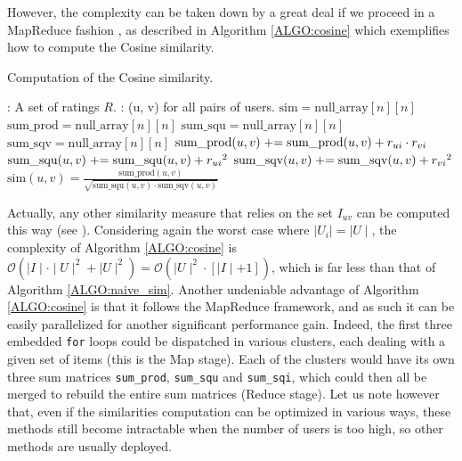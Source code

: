 However, the complexity can be taken down by a great deal if we proceed in a
MapReduce fashion \cite{DeaGhe04}, as described in Algorithm \ref{ALGO:cosine}
which exemplifies how to compute the Cosine similarity.
\begin{algorithm}[!ht]
 \caption{Computation of the Cosine similarity.}
       \label{ALGO:cosine}
       \begin{algorithmic}

         : A set of ratings $R$.
         : (u, v) for all pairs of users.
         \STATE $\text{sim} = \text{null\_array}[n][n]$
         \STATE $\text{sum\_prod} = \text{null\_array}[n][n]$
         \STATE $\text{sum\_squ} = \text{null\_array}[n][n]$
         \STATE $\text{sum\_sqv} = \text{null\_array}[n][n]$
              \STATE $\text{sum\_prod}(u, v) \mathrel{+}= \text{sum\_prod}(u, v) +
              r_{ui} \cdot r_{vi}$
              \STATE $\text{sum\_squ}(u, v) \mathrel{+}= \text{sum\_squ}(u, v) +
              {r_{ui}}^2$
              \STATE $\text{sum\_sqv}(u, v) \mathrel{+}= \text{sum\_sqv}(u, v) +
              {r_{vi}}^2$
             \ENDFOR
           \ENDFOR
         \ENDFOR
           \STATE $\text{sim}(u, v) = \frac{\text{sum\_prod}(u,
           v)}{\sqrt{\text{sum\_squ}(u, v) \cdot \text{sum\_sqv}(u, v)}}$
           \ENDFOR
         \ENDFOR
\end{algorithmic}
\end{algorithm}
Actually, any other similarity measure that relies on the set $I_{uv}$ can be
computed this way (see \cite{SchBodVolRECSYS12}). Considering again the worst
case where $\mid U_i \mid = \mid U \mid$, the complexity of Algorithm
\ref{ALGO:cosine} is  $\mathcal{O}(\mid I \mid \cdot \mid U \mid^2 + \mid
U \mid^2) = \mathcal{O}( \mid U \mid^2 \cdot [ \mid I \mid + 1])$, which is far
less than that of Algorithm \ref{ALGO:naive_sim}. Another undeniable advantage
of Algorithm  \ref{ALGO:cosine} is that it follows the MapReduce framework, and
as such it can be easily parallelized for another significant performance gain.
Indeed, the first three embedded \texttt{for} loops could be dispatched in various
clusters, each dealing with a given set of items (this is the Map stage). Each
of the clusters would have its own three sum matrices \texttt{sum\_prod},
\texttt{sum\_squ} and \texttt{sum\_sqi}, which could then all be merged to
rebuild the entire sum matrices (Reduce stage). Let us note however that, even
if the similarities computation can be optimized in various ways, these methods
still become intractable when the number of users is too high, so other
methods are usually deployed.

